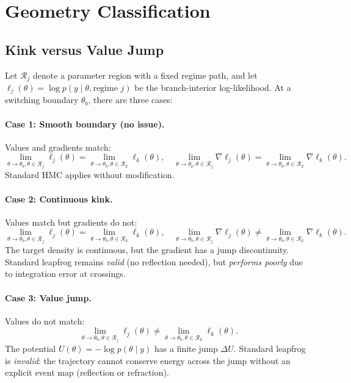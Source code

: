\section{Geometry Classification}

\subsection{Kink versus Value Jump}

Let $\mathcal{R}_j$ denote a parameter region with a fixed regime path, and
let $\ell_j(\theta) = \log p(y \mid \theta, \text{regime } j)$ be the
branch-interior log-likelihood. At a switching boundary $\theta_b$, there are
three cases:

\paragraph{Case 1: Smooth boundary (no issue).}
Values and gradients match:
\begin{equation}
  \lim_{\theta \to \theta_b, \theta \in \mathcal{R}_j} \ell_j(\theta)
  = \lim_{\theta \to \theta_b, \theta \in \mathcal{R}_k} \ell_k(\theta),
  \quad
  \lim_{\theta \to \theta_b, \theta \in \mathcal{R}_j} \nabla \ell_j(\theta)
  = \lim_{\theta \to \theta_b, \theta \in \mathcal{R}_k} \nabla \ell_k(\theta).
\end{equation}
Standard HMC applies without modification.

\paragraph{Case 2: Continuous kink.}
Values match but gradients do not:
\begin{equation}
  \lim_{\theta \to \theta_b, \theta \in \mathcal{R}_j} \ell_j(\theta)
  = \lim_{\theta \to \theta_b, \theta \in \mathcal{R}_k} \ell_k(\theta),
  \quad
  \lim_{\theta \to \theta_b, \theta \in \mathcal{R}_j} \nabla \ell_j(\theta)
  \ne \lim_{\theta \to \theta_b, \theta \in \mathcal{R}_k} \nabla \ell_k(\theta).
\end{equation}
The target density is continuous, but the gradient has a jump discontinuity.
Standard leapfrog remains \emph{valid} (no reflection needed), but
\emph{performs poorly} due to integration error at crossings.

\paragraph{Case 3: Value jump.}
Values do not match:
\begin{equation}
  \lim_{\theta \to \theta_b, \theta \in \mathcal{R}_j} \ell_j(\theta)
  \ne \lim_{\theta \to \theta_b, \theta \in \mathcal{R}_k} \ell_k(\theta).
\end{equation}
The potential $U(\theta) = -\log p(\theta \mid y)$ has a finite jump
$\Delta U$. Standard leapfrog is \emph{invalid}: the trajectory cannot
conserve energy across the jump without an explicit event map (reflection or
refraction).

